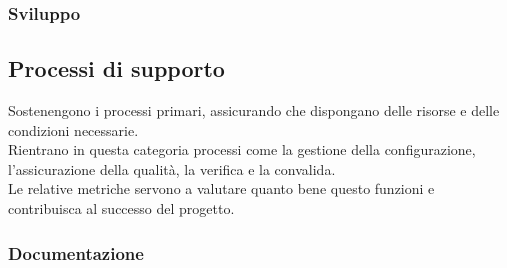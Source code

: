 \subsubsection{Sviluppo}\vspace{-0.2cm}
\begin{table}[H]
    \centering
    \renewcommand{\arraystretch}{1.15}
    \vspace{-0.3cm}
    \caption{Processi primari - Metriche del processo di sviluppo}
\end{table}

\subsection{Processi di supporto}
Sostenengono i processi primari, assicurando che dispongano delle risorse e delle condizioni necessarie.\\
Rientrano in questa categoria processi come la gestione della configurazione, l'assicurazione della qualità, la verifica e la convalida.\\  
Le relative metriche servono a valutare quanto bene questo  funzioni e contribuisca al successo del progetto.

\subsubsection{Documentazione}\vspace{-0.2cm}
\begin{table}[h]
    \centering
    \renewcommand{\arraystretch}{1.15}
    \vspace{-0.3cm}
    \caption{Processi di supporto - Metriche del processo di documentazione}
\end{table}

